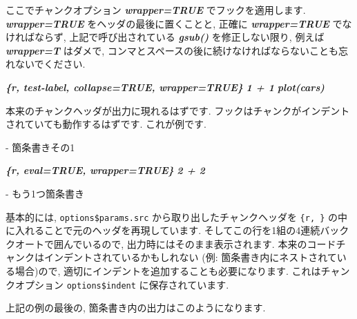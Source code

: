 \documentclass[
  11pt,
  lualatex,ja=standard,jafont=noto]{bxjsreport}
\newenvironment{Shaded}{\begin{snugshade}}{\end{snugshade}}
\newcommand{\InformationTok}[1]{\textcolor[rgb]{0.56,0.35,0.01}{\textbf{\textit{#1}}}}
\newcommand{\NormalTok}[1]{#1}
\newcommand{\SpecialStringTok}[1]{\textcolor[rgb]{0.31,0.60,0.02}{#1}}
\begin{document}
\begin{Shaded}
\begin{Highlighting}[]
\NormalTok{ここでチャンクオプション }\InformationTok{\textasciigrave{}wrapper=TRUE\textasciigrave{}}\NormalTok{  でフックを適用します. }\InformationTok{\textasciigrave{}wrapper=TRUE\textasciigrave{}}\NormalTok{ をヘッダの最後に置くことと, 正確に }\InformationTok{\textasciigrave{}wrapper=TRUE\textasciigrave{}}\NormalTok{ でなければならず, 上記で呼び出されている }\InformationTok{\textasciigrave{}gsub()\textasciigrave{}}\NormalTok{ を修正しない限り, 例えば }\InformationTok{\textasciigrave{}wrapper=T\textasciigrave{}}\NormalTok{ はダメで,  コンマとスペースの後に続けなければならないことも忘れないでください.}

\InformationTok{\textasciigrave{}\textasciigrave{}\textasciigrave{}\{r, test{-}label, collapse=TRUE, wrapper=TRUE\}}
\InformationTok{1 + 1}
\InformationTok{plot(cars)}
\InformationTok{\textasciigrave{}\textasciigrave{}\textasciigrave{}}

\NormalTok{本来のチャンクヘッダが出力に現れるはずです. フックはチャンクがインデントされていても動作するはずです. これが例です.}

\SpecialStringTok{{-} }\NormalTok{箇条書きその1}

  \InformationTok{\textasciigrave{}\textasciigrave{}\textasciigrave{}\{r, eval=TRUE, wrapper=TRUE\}}
\InformationTok{  2 + 2}
\InformationTok{  \textasciigrave{}\textasciigrave{}\textasciigrave{}}

\SpecialStringTok{{-} }\NormalTok{もう1つ箇条書き}
\end{Highlighting}
\end{Shaded}

基本的には, \texttt{options\$params.src} から取り出したチャンクヘッダを \texttt{\textasciigrave{}\textasciigrave{}\textasciigrave{}\{r,\ \}} の中に入れることで元のヘッダを再現しています. そしてこの行を1組の4連続バッククオートで囲んでいるので, 出力時にはそのまま表示されます. 本来のコードチャンクはインデントされているかもしれない (例: 箇条書き内にネストされている場合)ので, 適切にインデントを追加することも必要になります. これはチャンクオプション \texttt{options\$indent} に保存されています.

上記の例の最後の, 箇条書き内の出力はこのようになります.
\end{document}
